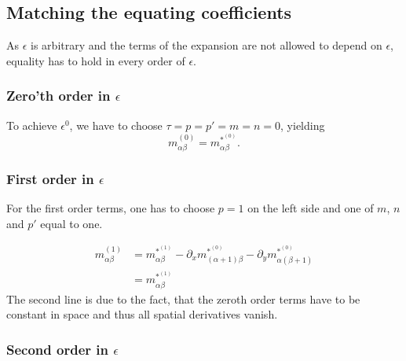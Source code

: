 \subsection{Matching the equating coefficients}
\label{sub:Matching the equating coefficients}
As $\epsilon$ is arbitrary and the terms of the expansion are not allowed to depend on $\epsilon$, equality has to hold in every order of $\epsilon$.

\subsubsection{Zero'th order in \texorpdfstring{$\epsilon$}{epsilon}}
\label{subs:Zeroth order in epsilon}

To achieve $\epsilon^0$, we have to choose $\tau=p=p'=m=n=0$, yielding
\begin{equation}
  \label{eq:zeroth order in epsilon}
  m_{\alpha\beta}^{(0)} = m_{\alpha\beta}^{*^{(0)}}.
\end{equation}


\subsubsection{First order in \texorpdfstring{$\epsilon$}{epsilon}}
\label{subs:First order in epsilon}

For the first order terms, one has to choose $p=1$ on the left side and one of $m$, $n$ and $p'$ equal to one.

\begin{equation}
  \label{eq:first order in epsilon}
  \begin{aligned}
  m_{\alpha\beta}^{(1)}
  & = m_{\alpha\beta}^{*^{(1)}}
  - \partial_x m_{(\alpha+1)\beta}^{*^{(0)}} - \partial_y m_{\alpha(\beta+1)}^{*^{(0)}} \\
  & = m_{\alpha\beta}^{*^{(1)}}
  \end{aligned}
\end{equation}
The second line is due to the fact, that the zeroth order terms have to be constant in space and thus all spatial derivatives vanish.

\subsubsection{Second order in \texorpdfstring{$\epsilon$}{epsilon}}
\label{subs:Second order in epsilon}

